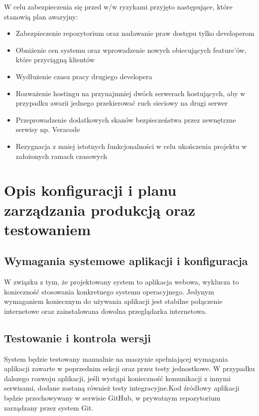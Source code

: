 \documentclass{article}
\begin{document}
W celu zabezpieczenia się przed w/w ryzykami przyjęto następujące, które stanowią plan awaryjny:
\begin{itemize}
  \item Zabezpieczenie repozytorium oraz nadawanie praw dostępu tylko developerom
  \item Obniżenie cen systemu oraz wprowadzenie nowych obiecujących feature'ów, które przyciągną klientów
  \item Wydłużenie czasu pracy drugiego developera
  \item Rozważenie hostingu na przynajmniej dwóch serwerach hostujących, aby w przypadku awarii jednego przekierować ruch sieciowy na drugi serwer
  \item Przeprowadzenie dodatkowych skanów bezpieczeństwa przez zewnętrzne serwisy np. Veracode
  \item Rezygnacja z mniej istotnych funkcjonalności w celu ukończenia projektu w założonych ramach czasowych
\end{itemize}


\section{Opis konfiguracji i planu zarządzania produkcją oraz testowaniem}

\subsection{Wymagania systemowe aplikacji i konfiguracja}
W związku z tym, że projektowany system to aplikacja webowa, wyklucza to konieczność stosowania konkretnego systemu operacyjnego. Jedynym wymaganiem koniecznym do używania aplikacji jest stabilne połączenie internetowe oraz zainstalowana dowolna przeglądarka internetowa.

\subsection{Testowanie i kontrola wersji}
System będzie testowany manualnie na maszynie spełniającej wymagania
aplikacji zawarte w poprzednim sekcji oraz przez testy jednostkowe. W przypadku dalszego rozwoju aplikacji, jeśli wystąpi konieczność komunikacji z innymi serwisami, dodane zostaną również testy integracyjne.Kod źródłowy aplikacji będzie przechowywany w serwisie GitHub, w prywatnym repozytorium zarządzany przez system Git.
\end{document}
